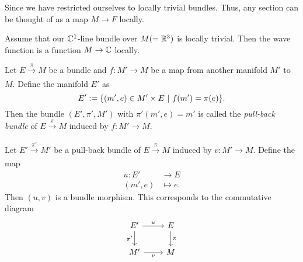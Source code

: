\begin{remark}
	Since we have restricted ourselves to locally trivial bundles. Thus, any section can be thought of as a map \(M \to F\) locally.
\end{remark}

\begin{example}
	Assume that our \(\mathbb C^1\)-line bundle over \(M (= \mathbb R^3)\) is locally trivial. Then the wave function is a function \(M \to \mathbb C\) locally.
\end{example}

\begin{definition}
	Let \(E \xrightarrow[]{\ \pi\ } M\) be a bundle and \(f: M' \to M\) be a map from another manifold \(M'\) to \(M\). Define the manifold \(E'\) as
	\begin{equation}
		E' := \qty{(m', e) \in M' \times E \ \middle|\ f(m') = \pi(e)}.
	\end{equation}
	Then the bundle \((E', \pi', M')\) with \(\pi'(m', e) = m'\) is called the \emph{pull-back bundle} of \(E \xrightarrow[]{\ \pi\ } M\) induced by \(f: M' \to M\).
\end{definition}

\begin{remark}
	Let \(E' \xrightarrow[]{\ \pi'\ } M'\) be a pull-back bundle of \(E \xrightarrow[]{\ \pi\ } M\) induced by \(v: M' \to M\). Define the map
	\begin{equation}
		\begin{aligned}
			u: E'   & \to E      \\
			(m', e) & \mapsto e.
		\end{aligned}
	\end{equation}
	Then \((u, v)\) is a bundle morphism. This corresponds to the commutative diagram
	\begin{equation*}
		\begin{tikzcd}
			E' \arrow[r, "u"] \arrow[d, "\pi'"'] & E \arrow[d, "\pi"] \\
			M' \arrow[r, "v"']                    & M
		\end{tikzcd}
	\end{equation*}
\end{remark}

